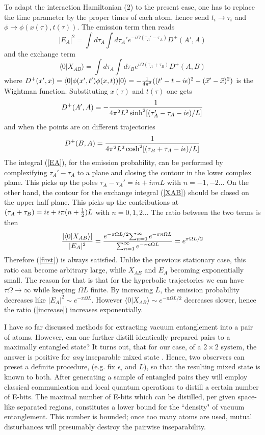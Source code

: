 \documentclass[12pt]{article}
\newcommand{\beq}{\begin{equation}}
\newcommand{\eeq}{\end{equation}}
\def \la {\langle}
\def \ra {\rangle}
\begin{document}
To adapt the  interaction Hamiltonian (2) to the present case,
one has to replace the  time parameter by the proper times of each
atom, hence send $t_i\to\tau_i$ and $\phi\to \phi(x(\tau),t(\tau))$.
The emission term then reads
\beq
|E_A|^2 = \int d\tau_A \int d\tau_A'
e^{-i\Omega(\tau_A'-\tau_A)} D^+(A',A)
\label{EA}
\eeq
and the  exchange term
\beq
\la 0|X_{AB}\ra = \int d\tau_A \int d\tau_B
e^{i\Omega(\tau_A+\tau_B)} D^+(A,B)
\label{XAB}
\eeq
where $D^+(x',x)=\la0 |\phi(x',t')\phi(x,t))|0\ra= -{1\over4\pi^2}
( (t'-t-i\epsilon)^2-({\vec x'} -{\vec  x})^2)$
is the Wightman function.
Substituting $x(\tau)$ and $t(\tau)$ one gets
\cite{birrell&davies}
\beq
D^+ (A',A) =- {1\over  4 \pi^2 L^2 \sinh^2[
( \tau_A'-\tau_A -i\epsilon)/L]}
\eeq
and when the points are on different trajectories
\beq    D^+(B,A)
 ={1\over 4 \pi^2 L^2\cosh^2[(\tau_B+\tau_A-i\epsilon)/L]}
\eeq
The integral (\ref{EA}), for the emission probability, can be performed
by complexifying $\tau_A'-\tau_A$ to a plane and closing
the contour in the lower complex plane. This picks up the poles
$\tau_A-\tau_A' = i\epsilon + i\pi nL$ with $n= -1,-2...$
On the other hand, the contour for the exchange integral (\ref{XAB})
should be closed on the upper half plane. This picks up the contributions at
$(\tau_A+\tau_B)=i\epsilon + i\pi (n+{1\over2})L $  with $n=0,1,2...$
The ratio between the two terms is then
\beq
{|\la 0|X_{AB}\ra| \over |E_A|^2}
= { e^{-\pi
\Omega L /2}{\sum_{n=0}^\infty e^{-\pi n\Omega L} } \over
 \sum_{n=1}^\infty e^{-\pi n\Omega L} } = e^{\pi\Omega L/2}
\label{increase}
\eeq
Therefore (\ref{first}) is always satisfied.
Unlike the previous stationary case, this ratio can become
arbitrary large, while $X_{AB}$ and $E_A$ becoming exponentially small.
The reason for that is that for the hyperbolic trajectories
we can have $\tau\Omega\to \infty$ while keeping $\Omega L$ finite.
By increasing $L$, the emission probability decreases like
$|E_A|^2\sim e^{-\pi \Omega L}$.
However $\la0|X_{AB}\ra\sim e^{-\pi \Omega L/2}$
decreases slower, hence the ratio (\ref{increase})
increases exponentially.




I have so far discussed methods for extracting vacuum
entanglement into a pair of atoms.
However, can one further distill identically prepared pairs to
a maximally entangled state?
It turns out, that for our case,
of a  $2\times2$ system, the answer is positive for
{\em any} inseparable mixed state \cite{any2*2}.
Hence, two observers can preset a definite procedure,
(e.g. fix $\epsilon_i$ and $L$),
so that the resulting mixed state is known to both.
After generating a sample of entangled pairs they will employ
classical communication and local quantum operations
to distill a certain number of E-bits.
The maximal number of  E-bits which
can be distilled, per given space-like separated regions,
constitutes a lower bound for the ``density" of vacuum entanglement.
This number is bounded; once too many atoms are used,
mutual disturbances will presumably destroy
the pairwise inseparability.
\end{document}
